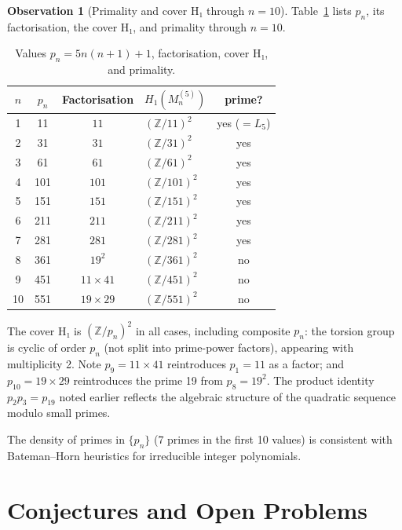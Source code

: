 \documentclass[11pt,a4paper]{article}
\theoremstyle{definition}
\newtheorem{observation}[theorem]{Observation}
\newcommand{\ZZ}{\mathbb{Z}}
\begin{document}
\begin{observation}[Primality and cover H₁ through $n=10$]
Table~\ref{tab:primality} lists $p_n$, its factorisation,
the cover H₁, and primality through $n=10$.

\begin{table}[htbp]
\centering
\caption{Values $p_n=5n(n+1)+1$, factorisation,
cover H₁, and primality.}
\label{tab:primality}
\begin{tabular}{ccclc}
\toprule
$n$ & $p_n$ & Factorisation & $H_1(M_n^{(5)})$ & prime? \\
\midrule
 1 &   11 & $11$           & $(\ZZ/11)^2$  & yes ($=L_5$) \\
 2 &   31 & $31$           & $(\ZZ/31)^2$  & yes \\
 3 &   61 & $61$           & $(\ZZ/61)^2$  & yes \\
 4 &  101 & $101$          & $(\ZZ/101)^2$ & yes \\
 5 &  151 & $151$          & $(\ZZ/151)^2$ & yes \\
 6 &  211 & $211$          & $(\ZZ/211)^2$ & yes \\
 7 &  281 & $281$          & $(\ZZ/281)^2$ & yes \\
 8 &  361 & $19^2$         & $(\ZZ/361)^2$ & no \\
 9 &  451 & $11\times41$   & $(\ZZ/451)^2$ & no \\
10 &  551 & $19\times29$   & $(\ZZ/551)^2$ & no \\
\bottomrule
\end{tabular}
\end{table}

The cover H₁ is $(\ZZ/p_n)^2$ in all cases, including
composite $p_n$: the torsion group is cyclic of order $p_n$
(not split into prime-power factors), appearing with multiplicity 2.
Note $p_9 = 11 \times 41$ reintroduces $p_1 = 11$ as a factor;
and $p_{10} = 19 \times 29$ reintroduces the prime 19
from $p_8 = 19^2$. The product identity $p_2 p_3 = p_{19}$
noted earlier reflects the algebraic structure of the quadratic
sequence modulo small primes.

The density of primes in $\{p_n\}$ (7 primes in the first 10 values)
is consistent with Bateman--Horn heuristics for irreducible
integer polynomials.
\end{observation}

\section{Conjectures and Open Problems}
\label{sec:conjectures}
\end{document}
